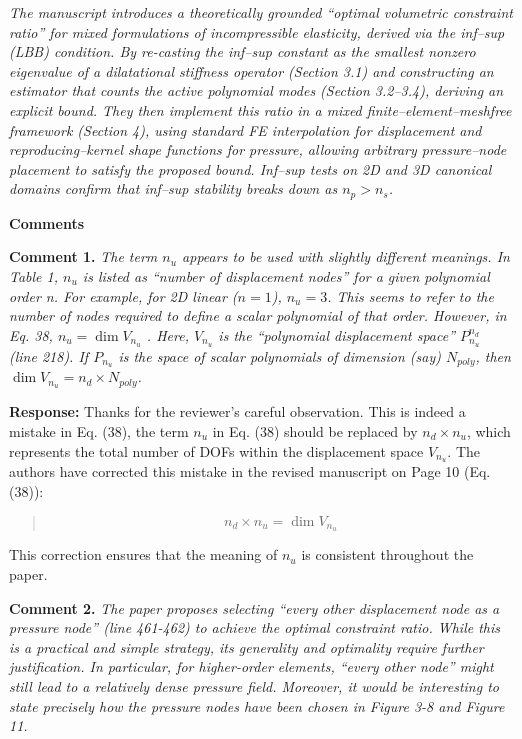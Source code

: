 \documentclass{article}
\begin{document}
\textit{The manuscript introduces a theoretically grounded “optimal volumetric constraint ratio” for mixed formulations of incompressible elasticity, derived via the inf–sup (LBB) condition. By re-casting the inf–sup constant as the smallest nonzero eigenvalue of a dilatational stiffness operator (Section 3.1) and constructing an estimator that counts the active polynomial modes (Section 3.2–3.4), deriving an explicit bound. They then implement this ratio in a mixed finite–element–meshfree framework (Section 4), using standard FE interpolation for displacement and reproducing–kernel shape functions for pressure, allowing arbitrary pressure–node placement to satisfy the proposed bound. Inf–sup tests on 2D and 3D canonical domains confirm that inf–sup stability breaks down
as $n_p > n_s$.}

\noindent\textbf{Comments}

\textbf{Comment 1.} \textit{The term $n_u$ appears to be used with slightly different meanings. In Table 1, $n_u$ is listed as “number of displacement nodes” for a given polynomial order n. For example, for 2D linear ($n = 1$), $n_u = 3$. This seems to refer to the number of nodes required to define a scalar polynomial of that order. However, in Eq. 38, $n_u = \dim V_{n_u}$ . Here, $V_{n_u}$ is the “polynomial displacement space” $P^{n_d}_{n_u}$ (line 218). If $P_{n_u}$ is the space of scalar polynomials of dimension (say) $N_{poly}$, then $\dim V_{n_u} = n_d\times N_{poly}$.}

\textbf{Response:} Thanks for the reviewer's careful observation.
This is indeed a mistake in Eq. (38), the term $n_u$ in Eq. (38) should be replaced by $n_d\times n_u$, which represents the total number of DOFs within the displacement space $V_{n_u}$.
The authors have corrected this mistake in the revised manuscript on Page 10 (Eq. (38)):
\begin{quote}
\begin{equation*}
n_d \times n_u = \dim V_{n_u}
\end{equation*}
\end{quote}
This correction ensures that the meaning of $n_u$ is consistent throughout the paper.

\textbf{Comment 2.} \textit{The paper proposes selecting ``every other displacement node as a pressure node'' (line 461-462) to achieve the optimal constraint ratio. While this is a practical and simple strategy, its generality and optimality require further justification. In particular, for higher-order elements, ``every other node'' might still lead to a relatively dense pressure field. Moreover, it would be interesting to state precisely how the pressure nodes have been chosen in Figure 3-8 and Figure
11.}
\end{document}
